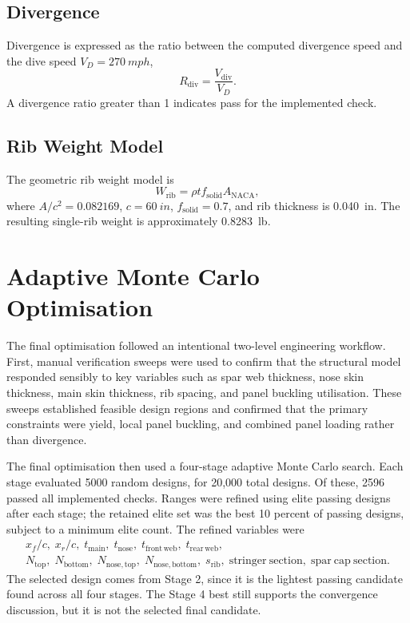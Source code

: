 \documentclass[11pt]{article}
\begin{document}
\subsection{Divergence}

Divergence is expressed as the ratio between the computed divergence speed and the dive speed $V_D=\SI{270}{mph}$,
\begin{equation}
  R_{\mathrm{div}} = \frac{V_{\mathrm{div}}}{V_D}.
\end{equation}
A divergence ratio greater than 1 indicates pass for the implemented check.

\subsection{Rib Weight Model}

The geometric rib weight model is
\begin{equation}
  W_{\mathrm{rib}} = \rho t f_{\mathrm{solid}} A_{\mathrm{NACA}},
\end{equation}
where $A/c^2=0.082169$, $c=\SI{60}{in}$, $f_{\mathrm{solid}}=0.7$, and rib thickness is \SI{0.040}{in}. The resulting single-rib weight is approximately \SI{0.8283}{lb}.

\section{Adaptive Monte Carlo Optimisation}

The final optimisation followed an intentional two-level engineering workflow. First, manual verification sweeps were used to confirm that the structural model responded sensibly to key variables such as spar web thickness, nose skin thickness, main skin thickness, rib spacing, and panel buckling utilisation. These sweeps established feasible design regions and confirmed that the primary constraints were yield, local panel buckling, and combined panel loading rather than divergence.

The final optimisation then used a four-stage adaptive Monte Carlo search. Each stage evaluated 5000 random designs, for 20,000 total designs. Of these, 2596 passed all implemented checks. Ranges were refined using elite passing designs after each stage; the retained elite set was the best 10 percent of passing designs, subject to a minimum elite count. The refined variables were
\[
\begin{gathered}
  x_{f}/c,\; x_{r}/c,\; t_{\mathrm{main}},\; t_{\mathrm{nose}},\;
  t_{\mathrm{front\,web}},\; t_{\mathrm{rear\,web}},\\
  N_{\mathrm{top}},\; N_{\mathrm{bottom}},\; N_{\mathrm{nose,top}},\;
  N_{\mathrm{nose,bottom}},\; s_{\mathrm{rib}},\;
  \mathrm{stringer\ section},\; \mathrm{spar\ cap\ section}.
\end{gathered}
\]
The selected design comes from Stage 2, since it is the lightest passing candidate found across all four stages. The Stage 4 best still supports the convergence discussion, but it is not the selected final candidate.
\end{document}
